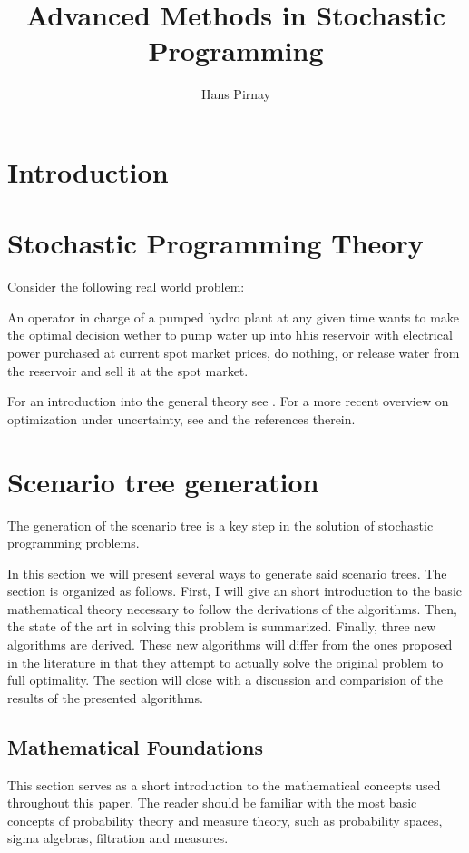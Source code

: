 \documentclass[a4paper, 12pt] {article}
\begin{document}
\listoftodos
\newpage
\title{Advanced Methods in Stochastic Programming}
\author{Hans Pirnay}
\maketitle
\tableofcontents
\newpage
\section{Introduction}
\section{Stochastic Programming Theory}
Consider the following real world problem:

An operator in charge of a pumped hydro plant at any given time wants to make the optimal decision wether to pump water up into hhis reservoir with electrical power purchased at current spot market prices, do nothing, or release water from the reservoir and sell it at the spot market. 

For an introduction into the general theory see \cite{Birge1997}. For a more recent overview on optimization under uncertainty, see \cite{Sahinidis2004} and the references therein.
\section{Scenario tree generation}
The generation of the scenario tree is a key step in the solution of stochastic programming problems.

In this section we will present several ways to generate said scenario trees. The section is organized as follows. First, I will give an short introduction to the basic mathematical theory necessary to follow the derivations of the algorithms. Then, the state of the art in solving this problem is summarized. Finally, three new algorithms are derived. These new algorithms will differ from the ones proposed in the literature in that they attempt to actually solve the original problem to full optimality. The section will close with a discussion and comparision of the results of the presented algorithms. 
\subsection{Mathematical Foundations}
This section serves as a short introduction to the mathematical concepts used throughout this paper. The reader should be familiar with the most basic concepts of probability theory and measure theory, such as probability spaces, sigma algebras, filtration and measures.
\end{document}
